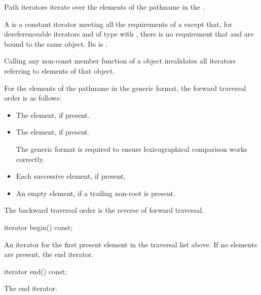 %
\pnum
Path iterators iterate over the elements of the pathname
in the .

\pnum
A  is a constant iterator meeting all the
requirements of a 
except that,
for dereferenceable iterators  and 
of type 
with ,
there is no requirement that  and 
are bound to the same object.
Its  is .

\pnum
Calling any non-const member function of a  object
invalidates all iterators referring to elements of that object.

\pnum
For the elements of the pathname in the generic format,
the forward traversal order is as follows:
\begin{itemize}
\item The  element, if present.
\item The  element, if present.
\begin{note}
The generic format is required to ensure lexicographical
comparison works correctly.
\end{note}
\item Each successive  element, if present.
\item An empty element, if a trailing non-root 
is present.
\end{itemize}

\pnum
The backward traversal order is the reverse of forward traversal.

%
\begin{itemdecl}
iterator begin() const;
\end{itemdecl}

\begin{itemdescr}
\pnum
\returns
An iterator for the first present element in the traversal
list above. If no elements are present, the end iterator.
\end{itemdescr}

%
\begin{itemdecl}
iterator end() const;
\end{itemdecl}

\begin{itemdescr}
\pnum
\returns
The end iterator.
\end{itemdescr}

